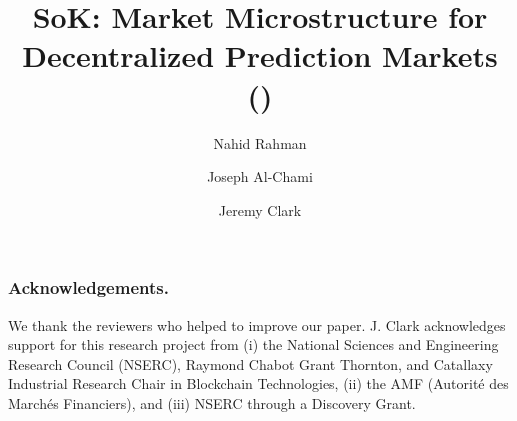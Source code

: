 \documentclass[runningheads]{llncs}
\begin{document}
\title{ SoK: Market Microstructure for Decentralized Prediction Markets (\depms)}

\author{
	Nahid Rahman \and 
	Joseph Al-Chami \and 
	Jeremy Clark
	}

	

\maketitle









\subsubsection*{Acknowledgements.} We thank the reviewers who helped to improve our paper. J. Clark acknowledges support for this research project from (i) the National Sciences and Engineering Research Council (NSERC), Raymond Chabot Grant Thornton, and Catallaxy Industrial Research Chair in Blockchain Technologies, (ii) the AMF (Autorité des Marchés Financiers), and (iii) NSERC through a Discovery Grant. 





\clearpage
\appendix


\end{document}
